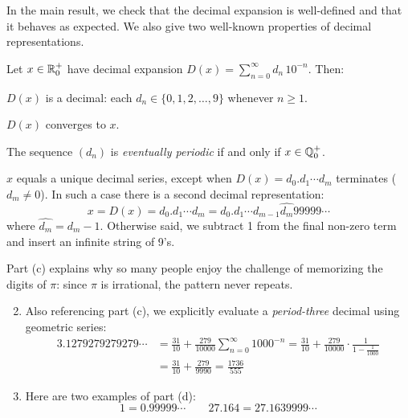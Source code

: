 \goodbreak


In the main result, we check that the decimal expansion is well-defined and that it behaves as expected. We also give two well-known properties of decimal representations.

\begin{thm*}{}{}
	Let $x\in\mathbb{R}^+_0$ have decimal expansion $D(x)=\sum\limits_{n=0}^\infty d_n\,10^{-n}$. Then:
	\begin{enumeratea}
	  \item $D(x)$ is a decimal: each $d_n\in\{0,1,2,\ldots,9\}$ whenever $n\ge 1$.
	  \item $D(x)$ converges to $x$.
	  \item The sequence $(d_n)$ is \emph{eventually periodic} if and only if $x\in\mathbb{Q}^+_0$.
	  \item $x$ equals a unique decimal series, except when $D(x)=d_0.d_1\cdots d_m$ terminates ($d_m\neq 0$). In such a case there is a second decimal representation:
	  \[
	  	x=D(x) =d_0.d_1\cdots d_m =d_0.d_1\cdots d_{m-1}\hat{d_m}99999\cdots %
	  \]
	  where $\hat{d_m}=d_m-1$. Otherwise said, we subtract 1 from the final non-zero term and insert an infinite string of 9's.
	\end{enumeratea}
\end{thm*}

\begin{examples*}{}{}
	\exstart Part (c) explains why so many people enjoy the challenge of memorizing the digits of $\pi$: since $\pi$ is irrational, the pattern never repeats. 
	\begin{enumerate}\setcounter{enumi}{1}
	  \item Also referencing part (c), we explicitly evaluate a \emph{period-three} decimal using geometric series:
	  \begin{align*}
	  	3.1279279279279\cdots&=\frac{31}{10}+\frac{279}{10000}\sum_{n=0}^\infty 1000^{-n}
	  		=\frac{31}{10}+\frac{279}{10000}\cdot\frac 1{1-\frac 1{1000}}\\
	  	&=\frac{31}{10}+\frac{279}{9990} =\frac{1736}{555}
	  \end{align*}
	  \item Here are two examples of part (d): 
	  \[
	  	1=0.99999\cdots\qquad 27.164=27.1639999\cdots
	  \]
	\end{enumerate}
\end{examples*}


